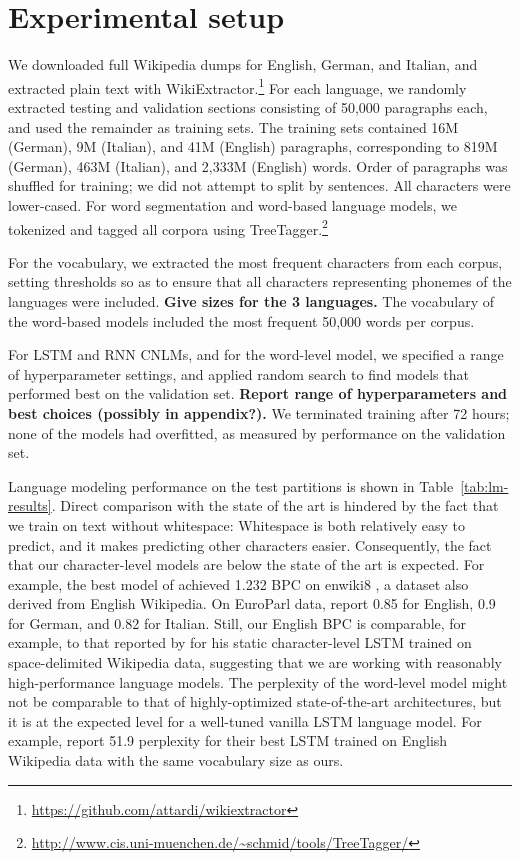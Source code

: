 \section{Experimental setup}
\label{sec:setup}

We downloaded full Wikipedia dumps for English, German, and Italian, and extracted plain text with WikiExtractor.\footnote{\url{https://github.com/attardi/wikiextractor}}
For each language, we randomly extracted testing and validation sections consisting of 50,000 paragraphs each, and used the remainder as training sets.
The training sets contained 16M (German), 9M (Italian), and 41M (English) paragraphs, corresponding to 819M (German), 463M (Italian), and 2,333M (English) words.
Order of paragraphs was shuffled for training; we did not attempt to split by sentences.
All characters were lower-cased.
For word segmentation and word-based language models, we tokenized and tagged all corpora using TreeTagger.\footnote{\url{http://www.cis.uni-muenchen.de/~schmid/tools/TreeTagger/}}

For the vocabulary, we extracted the most frequent characters from
each corpus, setting thresholds so as to ensure that all characters
representing phonemes of the languages were included. \textbf{Give
  sizes for the 3 languages.}  The vocabulary of the word-based models
included the most frequent 50,000 words per corpus.


For LSTM and RNN CNLMs, and for the word-level model, we specified a range of hyperparameter settings, and applied random search to find models that performed best on the validation set. \textbf{Report range of hyperparameters and best choices (possibly in appendix?).}
We terminated training after 72 hours; none of the models had overfitted, as measured by performance on the validation set.

Language modeling performance on the test partitions is shown in
Table~\ref{tab:lm-results}.  Direct comparison with the state of the art is hindered by
the fact that we train on text without whitespace: Whitespace is both
relatively easy to predict, and it makes predicting other
characters easier. Consequently, the fact that our character-level models are
below the state of the art is expected. For example, the best model of
 achieved 1.232 BPC on enwiki8
\cite{hutter2018}, a dataset also derived from English
Wikipedia. %
On EuroParl data,  report 0.85 for English,
0.9 for German, and 0.82 for Italian. Still, our English BPC is
comparable, for example, to that reported by  for
his static character-level LSTM trained on space-delimited Wikipedia data,
suggesting that we are working with reasonably high-performance language
models. The perplexity of the word-level model might not be comparable to
that of highly-optimized state-of-the-art architectures, but it is at the
expected level for a well-tuned vanilla LSTM language model. For
example,  report 51.9 perplexity for
their best LSTM trained on English Wikipedia data with the same vocabulary
size as ours.


